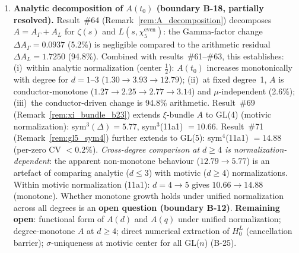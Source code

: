 \documentclass[11pt, a4paper]{article}
\theoremstyle{definition}
\theoremstyle{plain}
\begin{document}
\begin{enumerate}
        (result~\#31, up to $t\sim 10^4$), confirming degree-independent
        curvature stability.
        Zone~3 ($t\approx 147$) yields $\kappa\equiv 0$: a
        \emph{numerical precision barrier} ($|\Lambda|\sim 10^{-100}$,
        $\texttt{dps}=132$ insufficient), not a theoretical failure.
        We therefore claim GL(2) $\kappa$-stability and
        $\sigma$-localisation up to $t\approx 100$; the extension
        to $t\approx 147$ requires $\texttt{dps}\geq 200$.
        \textcolor{ForestGreen}{[conditional positive, 2026-04-16; GL(2) 11a1;
        $t\approx51$--$100$ PASS; $t{\approx}147$ numerical barrier;
        see \cref{sec:gl2_high_t}; numerical verification, not proof]}
  \item \textbf{Analytic decomposition of $A(t_0)$ (boundary B-18, partially resolved).}
        Result~\#64 (Remark~\ref{rem:A_decomposition}) decomposes $A = A_\Gamma + A_L$
        for $\zeta(s)$ and $L(s,\chi_5^{\mathrm{even}})$: the Gamma-factor change
        $\Delta A_\Gamma = 0.0937$ (5.2\%) is negligible compared to the arithmetic residual
        $\Delta A_L = 1.7250$ (94.8\%).  Combined with results~\#61--\#63, this establishes:
        (i)~within analytic normalization (center $\tfrac{1}{2}$):
        $A(t_0)$ increases monotonically with degree for $d = 1$--$3$
        ($1.30 \to 3.93 \to 12.79$);
        (ii)~at fixed degree~1, $A$ is conductor-monotone ($1.27 \to 2.25 \to 2.77 \to 3.14$)
        and $\mu$-independent (2.6\%);
        (iii)~the conductor-driven change is 94.8\% arithmetic.
        Result~\#69 (Remark~\ref{rem:xi_bundle_b23}) extends $\xi$-bundle $A$ to GL(4)
        (motivic normalization): sym$^3(\Delta) = 5.77$, sym$^3$(11a1) $= 10.66$.
        Result~\#71 (Remark~\ref{rem:gl5_sym4}) further extends to GL(5):
        sym$^4$(11a1) $= 14.88$ (per-zero CV $< 0.2\%$).
        \emph{Cross-degree comparison at $d \geq 4$ is normalization-dependent}:
        the apparent non-monotone behaviour ($12.79 \to 5.77$) is an artefact
        of comparing analytic ($d \leq 3$) with motivic ($d \geq 4$) normalizations.
        Within motivic normalization (11a1): $d = 4 \to 5$ gives $10.66 \to 14.88$ (monotone).
        Whether monotone growth holds under unified normalization across all degrees is an
        \textbf{open question (boundary B-12)}.
        \textbf{Remaining open}: functional form of $A(d)$ and $A(q)$
        under unified normalization; degree-monotone $A$ at $d \geq 4$;
        direct numerical extraction of $H_0^L$ (cancellation barrier);
        $\sigma$-uniqueness at motivic center for all GL($n$) (B-25).

\end{enumerate}
\end{document}

